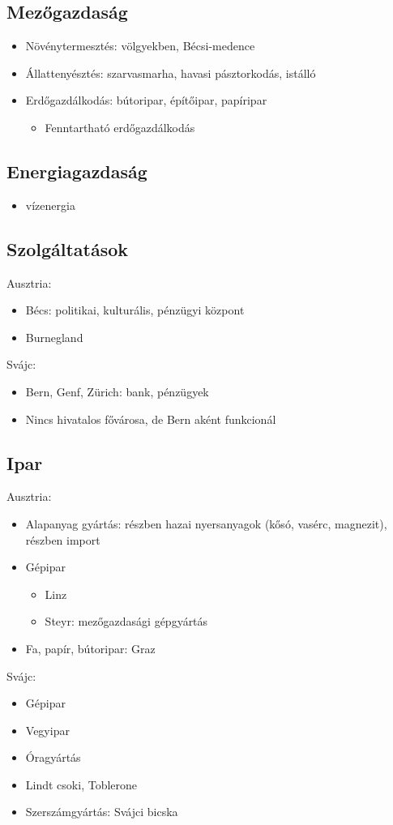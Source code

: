 \documentclass{article}
\begin{document}
\subsection{Mezőgazdaság}
\begin{itemize}
    \item Növénytermesztés: völgyekben, Bécsi-medence
    \item Állattenyésztés: szarvasmarha, havasi pásztorkodás, istálló
    \item Erdőgazdálkodás: bútoripar, építőipar, papíripar \begin{itemize}
        \item Fenntartható erdőgazdálkodás
    \end{itemize}
\end{itemize}

\subsection{Energiagazdaság}
\begin{itemize}
    \item vízenergia
\end{itemize}

\subsection{Szolgáltatások}
Ausztria:
\begin{itemize}
    \item Bécs: politikai, kulturális, pénzügyi központ
    \item Burnegland
\end{itemize}
Svájc:
\begin{itemize}
    \item Bern, Genf, Zürich: bank, pénzügyek
    \item Nincs hivatalos fővárosa, de Bern aként funkcionál
\end{itemize}

\subsection{Ipar}
Ausztria:
\begin{itemize}
    \item Alapanyag gyártás: részben hazai nyersanyagok (kősó, vasérc, magnezit), részben import
    \item Gépipar \begin{itemize}
        \item Linz
        \item Steyr: mezőgazdasági gépgyártás
    \end{itemize}
    \item Fa, papír, bútoripar: Graz
\end{itemize}
Svájc:
\begin{itemize}
    \item Gépipar
    \item Vegyipar
    \item Óragyártás
    \item Lindt csoki, Toblerone
    \item Szerszámgyártás: Svájci bicska
\end{itemize}
\end{document}
